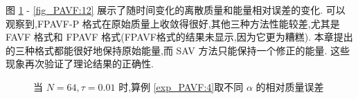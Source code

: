 	图 \ref{fig_PAVF:11} - \ref{fig_PAVF:12} 展示了随时间变化的离散质量和能量相对误差的变化.
	可以观察到,FPAVF-P 格式在原始质量上收敛得很好,其他三种方法性能较差,尤其是 FAVF 格式和 FPAVF 格式(FPAVF格式的结果未显示,因为它更为糟糕).
	本章提出的三种格式都能很好地保持原始能量,而 SAV 方法只能保持一个修正的能量.
	这些现象再次验证了理论结果的正确性.
\begin{figure}[H]
\begin{center}
\caption{当  $N = 64, \tau=0.01$ 时,算例 \ref{exp_PAVF:4}取不同 $\alpha$ 的相对质量误差}
\label{fig_PAVF:11}
\end{center}
\end{figure}


